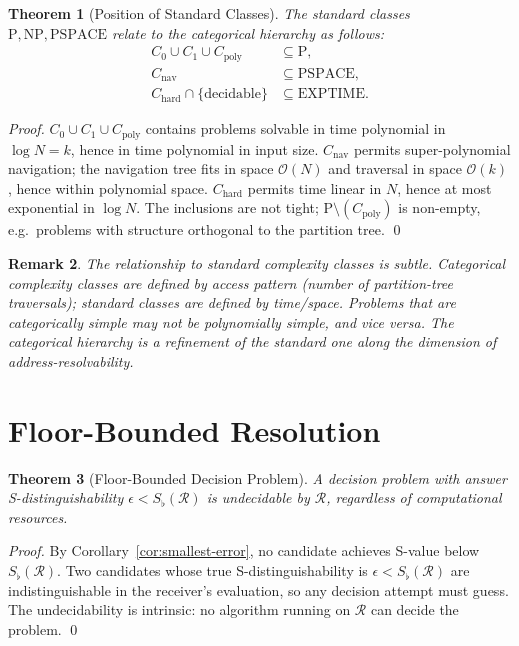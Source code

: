 \documentclass[twocolumn,a4paper]{article}
\newtheorem{theorem}{Theorem}[section]
\newtheorem{remark}[theorem]{Remark}
\newcommand{\receiver}{\mathcal{R}}
\newcommand{\Sfloor}{S_{\flat}}
\begin{document}
\begin{theorem}[Position of Standard Classes]
\label{thm:standard-classes}
The standard classes $\mathrm{P},\mathrm{NP},\mathrm{PSPACE}$ relate to the categorical hierarchy as follows:
\begin{align*}
C_{0}\cup C_{1}\cup C_{\text{poly}} &\subseteq \mathrm{P},\\
C_{\text{nav}} &\subseteq \mathrm{PSPACE},\\
C_{\text{hard}}\cap\{\text{decidable}\} &\subseteq \mathrm{EXPTIME}.
\end{align*}
\end{theorem}

\begin{proof}
$C_{0}\cup C_{1}\cup C_{\text{poly}}$ contains problems solvable in time polynomial in $\log N=k$, hence in time polynomial in input size. $C_{\text{nav}}$ permits super-polynomial navigation; the navigation tree fits in space $\mathcal{O}(N)$ and traversal in space $\mathcal{O}(k)$, hence within polynomial space. $C_{\text{hard}}$ permits time linear in $N$, hence at most exponential in $\log N$. The inclusions are not tight; $\mathrm{P}\setminus(C_{\text{poly}})$ is non-empty, e.g.\ problems with structure orthogonal to the partition tree. \qed
\end{proof}

\begin{remark}
The relationship to standard complexity classes is subtle. Categorical complexity classes are defined by access pattern (number of partition-tree traversals); standard classes are defined by time/space. Problems that are categorically simple may not be polynomially simple, and vice versa. The categorical hierarchy is a refinement of the standard one along the dimension of address-resolvability.
\end{remark}



\section{Floor-Bounded Resolution}
\label{sec:floor-resolution}

\begin{theorem}[Floor-Bounded Decision Problem]
\label{thm:floor-decision}
A decision problem with answer S-distinguishability $\epsilon<\Sfloor(\receiver)$ is undecidable by $\receiver$, regardless of computational resources.
\end{theorem}

\begin{proof}
By Corollary~\ref{cor:smallest-error}, no candidate achieves S-value below $\Sfloor(\receiver)$. Two candidates whose true S-distinguishability is $\epsilon<\Sfloor(\receiver)$ are indistinguishable in the receiver's evaluation, so any decision attempt must guess. The undecidability is intrinsic: no algorithm running on $\receiver$ can decide the problem. \qed
\end{proof}
\end{document}
